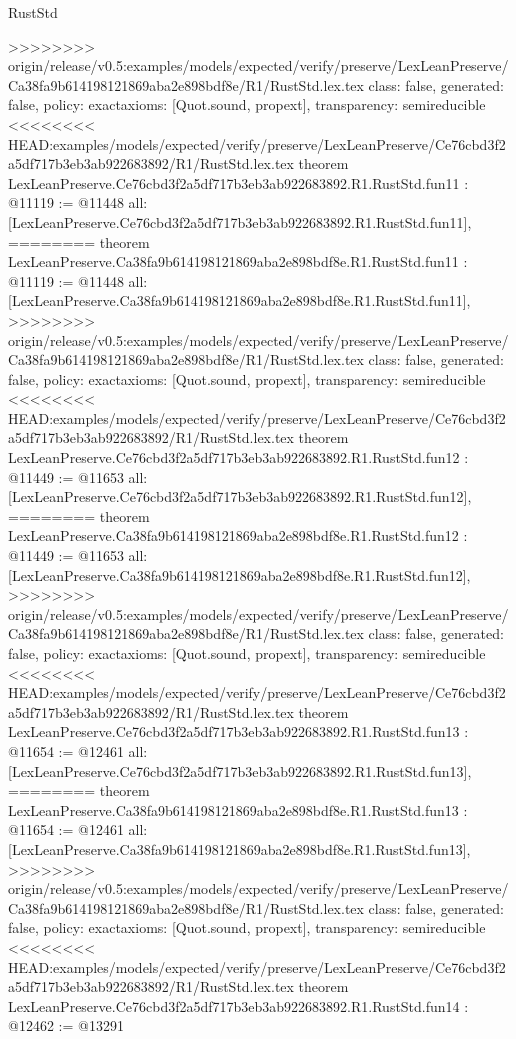 \begin{lexlean}{RustStd}
\begin{coremodule}
{\begin{coremodule}
{{{{{{{{{{{{{{>>>>>>>> origin/release/v0.5:examples/models/expected/verify/preserve/LexLeanPreserve/Ca38fa9b614198121869aba2e898bdf8e/R1/RustStd.lex.tex
  class: false,
  generated: false,
  policy: exact{axioms: [Quot.sound, propext]},
  transparency: semireducible
}
<<<<<<<< HEAD:examples/models/expected/verify/preserve/LexLeanPreserve/Ce76cbd3f2a5df717b3eb3ab922683892/R1/RustStd.lex.tex
theorem LexLeanPreserve.Ce76cbd3f2a5df717b3eb3ab922683892.R1.RustStd.fun11 : @11119 := @11448 {
  all: [LexLeanPreserve.Ce76cbd3f2a5df717b3eb3ab922683892.R1.RustStd.fun11],
========
theorem LexLeanPreserve.Ca38fa9b614198121869aba2e898bdf8e.R1.RustStd.fun11 : @11119 := @11448 {
  all: [LexLeanPreserve.Ca38fa9b614198121869aba2e898bdf8e.R1.RustStd.fun11],
>>>>>>>> origin/release/v0.5:examples/models/expected/verify/preserve/LexLeanPreserve/Ca38fa9b614198121869aba2e898bdf8e/R1/RustStd.lex.tex
  class: false,
  generated: false,
  policy: exact{axioms: [Quot.sound, propext]},
  transparency: semireducible
}
<<<<<<<< HEAD:examples/models/expected/verify/preserve/LexLeanPreserve/Ce76cbd3f2a5df717b3eb3ab922683892/R1/RustStd.lex.tex
theorem LexLeanPreserve.Ce76cbd3f2a5df717b3eb3ab922683892.R1.RustStd.fun12 : @11449 := @11653 {
  all: [LexLeanPreserve.Ce76cbd3f2a5df717b3eb3ab922683892.R1.RustStd.fun12],
========
theorem LexLeanPreserve.Ca38fa9b614198121869aba2e898bdf8e.R1.RustStd.fun12 : @11449 := @11653 {
  all: [LexLeanPreserve.Ca38fa9b614198121869aba2e898bdf8e.R1.RustStd.fun12],
>>>>>>>> origin/release/v0.5:examples/models/expected/verify/preserve/LexLeanPreserve/Ca38fa9b614198121869aba2e898bdf8e/R1/RustStd.lex.tex
  class: false,
  generated: false,
  policy: exact{axioms: [Quot.sound, propext]},
  transparency: semireducible
}
<<<<<<<< HEAD:examples/models/expected/verify/preserve/LexLeanPreserve/Ce76cbd3f2a5df717b3eb3ab922683892/R1/RustStd.lex.tex
theorem LexLeanPreserve.Ce76cbd3f2a5df717b3eb3ab922683892.R1.RustStd.fun13 : @11654 := @12461 {
  all: [LexLeanPreserve.Ce76cbd3f2a5df717b3eb3ab922683892.R1.RustStd.fun13],
========
theorem LexLeanPreserve.Ca38fa9b614198121869aba2e898bdf8e.R1.RustStd.fun13 : @11654 := @12461 {
  all: [LexLeanPreserve.Ca38fa9b614198121869aba2e898bdf8e.R1.RustStd.fun13],
>>>>>>>> origin/release/v0.5:examples/models/expected/verify/preserve/LexLeanPreserve/Ca38fa9b614198121869aba2e898bdf8e/R1/RustStd.lex.tex
  class: false,
  generated: false,
  policy: exact{axioms: [Quot.sound, propext]},
  transparency: semireducible
}
<<<<<<<< HEAD:examples/models/expected/verify/preserve/LexLeanPreserve/Ce76cbd3f2a5df717b3eb3ab922683892/R1/RustStd.lex.tex
theorem LexLeanPreserve.Ce76cbd3f2a5df717b3eb3ab922683892.R1.RustStd.fun14 : @12462 := @13291 {
}}}}}}}}}}}}}}}}}
\end{coremodule}}
\end{coremodule}
\end{lexlean}

